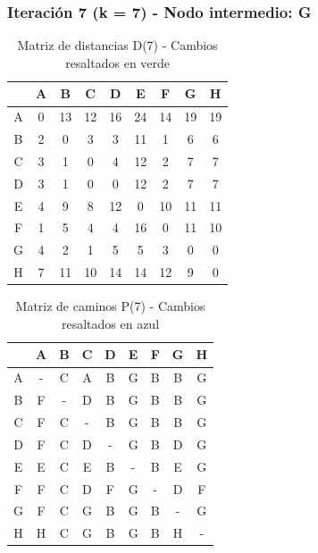 \documentclass[12pt]{article}
\begin{document}
\clearpage
\subsubsection{Iteración 7 (k = 7) - Nodo intermedio: G}
\begin{table}[h!]
\centering
\begin{tabular}{|c|c|c|c|c|c|c|c|c|}
\hline
 & A & B & C & D & E & F & G & H \\\hline
A & 0 & 13 & 12 & 16 & \cellcolor{lightgreen} 24 & 14 & 19 & \cellcolor{lightgreen} 19 \\\hline
B & 2 & 0 & 3 & 3 & \cellcolor{lightgreen} 11 & 1 & 6 & \cellcolor{lightgreen} 6 \\\hline
C & 3 & 1 & 0 & 4 & \cellcolor{lightgreen} 12 & 2 & 7 & \cellcolor{lightgreen} 7 \\\hline
D & 3 & 1 & 0 & 0 & \cellcolor{lightgreen} 12 & 2 & 7 & \cellcolor{lightgreen} 7 \\\hline
E & 4 & 9 & 8 & 12 & 0 & 10 & 11 & \cellcolor{lightgreen} 11 \\\hline
F & 1 & 5 & 4 & 4 & \cellcolor{lightgreen} 16 & 0 & 11 & 10 \\\hline
G & 4 & 2 & 1 & 5 & 5 & 3 & 0 & 0 \\\hline
H & 7 & \cellcolor{lightgreen} 11 & \cellcolor{lightgreen} 10 & \cellcolor{lightgreen} 14 & \cellcolor{lightgreen} 14 & \cellcolor{lightgreen} 12 & 9 & 0 \\\hline
\end{tabular}
\caption{Matriz de distancias D(7) - Cambios resaltados en verde}
\end{table}

\begin{table}[h!]
\centering
\begin{tabular}{|c|c|c|c|c|c|c|c|c|}
\hline
 & A & B & C & D & E & F & G & H \\\hline
A & - & C & A & B & \cellcolor{lightblue} G & B & B & \cellcolor{lightblue} G \\\hline
B & F & - & D & B & \cellcolor{lightblue} G & B & B & \cellcolor{lightblue} G \\\hline
C & F & C & - & B & \cellcolor{lightblue} G & B & B & \cellcolor{lightblue} G \\\hline
D & F & C & D & - & \cellcolor{lightblue} G & B & D & \cellcolor{lightblue} G \\\hline
E & E & C & E & B & - & B & E & \cellcolor{lightblue} G \\\hline
F & F & C & D & F & \cellcolor{lightblue} G & - & D & F \\\hline
G & F & C & G & B & G & B & - & G \\\hline
H & H & C & \cellcolor{lightblue} G & \cellcolor{lightblue} B & \cellcolor{lightblue} G & B & H & - \\\hline
\end{tabular}
\caption{Matriz de caminos P(7) - Cambios resaltados en azul}
\end{table}
\end{document}
